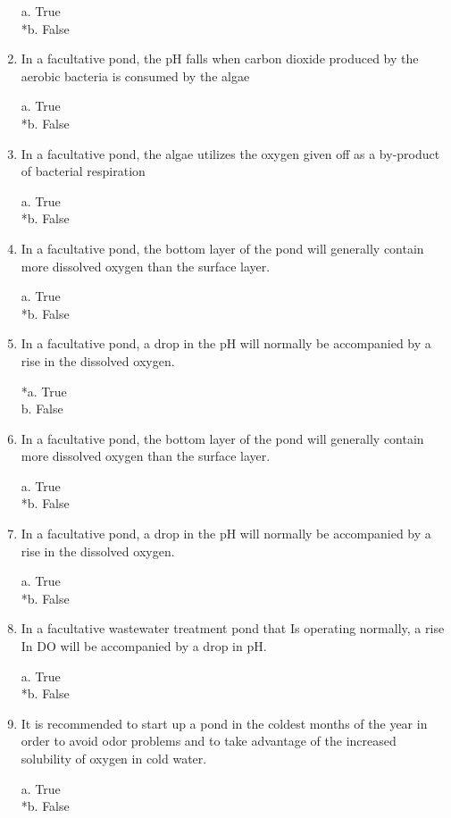 \begin{enumerate}
a. True \\
*b. False 


\item  In a facultative pond, the pH falls when carbon dioxide produced by the aerobic bacteria is consumed by the algae 

a. True \\
*b. False 


\item  In a facultative pond, the algae utilizes the oxygen given off as a by-product of bacterial respiration 

a. True \\
*b. False 


\item  In a facultative pond, the bottom layer of the pond will generally contain more dissolved oxygen than the surface layer. 

a. True \\
*b. False 


\item  In a facultative pond, a drop in the pH will normally be accompanied by a rise in the dissolved oxygen. 

*a. True \\
b. False 


\item  In a facultative pond, the bottom layer of the pond will generally contain more dissolved oxygen than the surface layer. 

a. True \\
*b. False 


\item  In a facultative pond, a drop in the pH will normally be accompanied by a rise in the dissolved oxygen. 

a. True \\
*b. False 


\item  In a facultative wastewater treatment pond that Is operating normally, a rise In DO will be accompanied by a drop in pH. 

a. True \\
*b. False 


\item  It is recommended to start up a pond in the coldest months of the year in order to avoid odor problems and to take advantage of the increased solubility of oxygen in cold water.

a. True \\
*b. False 



\end{enumerate}
